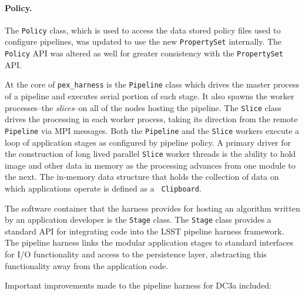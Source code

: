 \paragraph{Policy.}  The {\tt Policy} class, which is used to access
the data stored policy files used to configure pipelines, was updated
to use the new {\tt PropertySet} internally.  The {\tt Policy} API was
altered as well for greater consistency with the {\tt PropertySet}
API.  

 \label{sec:harness}

At the core of {\tt pex\_harness} is the {\tt Pipeline} class which
drives the master process of a pipeline and executes serial portion of
each stage.  It also spawns the worker processes--the {\it slices}--on
all of the nodes hosting the pipeline.  The {\tt Slice} class drives
the processing in each worker process, taking its direction from the
remote {\tt Pipeline} via MPI messages.  Both the {\tt Pipeline} and
the {\tt Slice} workers execute a loop of application stages as
configured by pipeline policy.  A primary driver for the construction
of long lived parallel {\tt Slice} worker threads is the ability to
hold image and other data in memory as the processing advances from
one module to the next. The in-memory data structure that holds the
collection of data on which applications operate is defined as a {\tt
Clipboard}.

The software container that the harness provides for hosting an
algorithm written by an application developer is the {\tt Stage}
class.  The {\tt Stage} class provides a standard API for integrating
code into the LSST pipeline harness framework.  The pipeline harness
links the modular application stages to standard interfaces for I/O
functionality and access to the persistence layer, abstracting this
functionality away from the application code.

Important improvements made to the pipeline harness for DC3a included:


